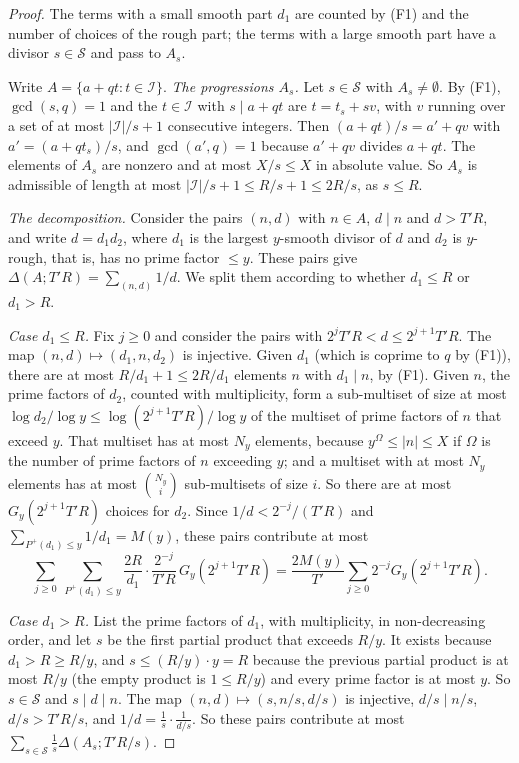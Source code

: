 \begin{proof}
The terms with a small smooth part $d_1$ are counted by (F1) and the number of choices of the rough part; the terms with a large smooth part have a divisor $s\in\mathcal S$ and pass to $A_s$.

Write $A=\{a+qt:t\in \mathcal I\}$. \emph{The progressions $A_s$.} Let $s\in\mathcal{S}$ with $A_s\ne\emptyset$. By (F1), $\gcd(s,q)=1$ and the $t\in \mathcal I$ with $s\mid a+qt$ are $t=t_s+sv$, with $v$ running over a set of at most $|\mathcal I|/s+1$ consecutive integers. Then $(a+qt)/s=a'+qv$ with $a'=(a+qt_s)/s$, and $\gcd(a',q)=1$ because $a'+qv$ divides $a+qt$. The elements of $A_s$ are nonzero and at most $X/s\le X$ in absolute value. So $A_s$ is admissible of length at most $|\mathcal I|/s+1\le R/s+1\le2R/s$, as $s\le R$.

\emph{The decomposition.} Consider the pairs $(n,d)$ with $n\in A$, $d\mid n$ and $d>T'R$, and write $d=d_1d_2$, where $d_1$ is the largest $y$-smooth divisor of $d$ and $d_2$ is $y$-rough, that is, has no prime factor $\le y$. These pairs give $\Delta(A;T'R)=\sum_{(n,d)}1/d$. We split them according to whether $d_1\le R$ or $d_1>R$.

\emph{Case $d_1\le R$.} Fix $j\ge0$ and consider the pairs with $2^jT'R<d\le2^{j+1}T'R$. The map $(n,d)\mapsto(d_1,n,d_2)$ is injective. Given $d_1$ (which is coprime to $q$ by (F1)), there are at most $R/d_1+1\le2R/d_1$ elements $n$ with $d_1\mid n$, by (F1). Given $n$, the prime factors of $d_2$, counted with multiplicity, form a sub-multiset of size at most $\log d_2/\log y\le\log(2^{j+1}T'R)/\log y$ of the multiset of prime factors of $n$ that exceed $y$. That multiset has at most $N_y$ elements, because $y^{\Omega}\le|n|\le X$ if $\Omega$ is the number of prime factors of $n$ exceeding $y$; and a multiset with at most $N_y$ elements has at most $\binom{N_y}{i}$ sub-multisets of size $i$. So there are at most $G_y(2^{j+1}T'R)$ choices for $d_2$. Since $1/d<2^{-j}/(T'R)$ and $\sum_{P^+(d_1)\le y}1/d_1=M(y)$, these pairs contribute at most
\[
\sum_{j\ge0}\ \sum_{P^+(d_1)\le y}\frac{2R}{d_1}\cdot\frac{2^{-j}}{T'R}\,G_y(2^{j+1}T'R)=\frac{2M(y)}{T'}\sum_{j\ge0}2^{-j}G_y(2^{j+1}T'R).
\]

\emph{Case $d_1>R$.} List the prime factors of $d_1$, with multiplicity, in non-decreasing order, and let $s$ be the first partial product that exceeds $R/y$. It exists because $d_1>R\ge R/y$, and $s\le(R/y)\cdot y=R$ because the previous partial product is at most $R/y$ (the empty product is $1\le R/y$) and every prime factor is at most $y$. So $s\in\mathcal{S}$ and $s\mid d\mid n$. The map $(n,d)\mapsto(s,n/s,d/s)$ is injective, $d/s\mid n/s$, $d/s>T'R/s$, and $1/d=\frac1s\cdot\frac1{d/s}$. So these pairs contribute at most $\sum_{s\in\mathcal{S}}\frac1s\Delta(A_s;T'R/s)$.
\end{proof}

